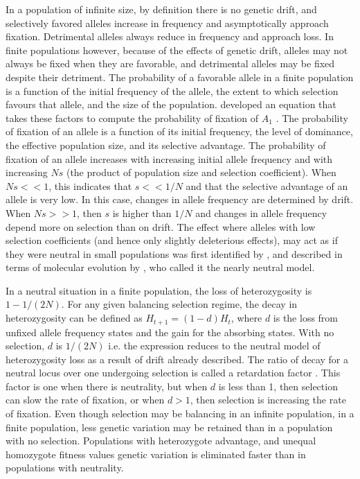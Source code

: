 In a population of infinite size, by definition there is no genetic drift, and selectively favored alleles increase in frequency and asymptotically approach fixation.
Detrimental alleles always reduce in frequency and approach loss.
In finite populations however, because of the effects of genetic drift, alleles may not always be fixed when they are favorable, and detrimental alleles may be fixed despite their detriment.
The probability of a favorable allele in a finite population is a function of the initial frequency of the allele, the extent to which selection favours that allele, and the size of the population.
\cite{Kimura1962} developed an equation that takes these factors to compute the probability of fixation of $A_1$ \parencite{kimura1971theoretical}.
The probability of fixation of an allele is a function of its initial frequency, the level of dominance, the effective population size, and its selective advantage.
The probability of fixation of an allele increases with increasing initial allele frequency and with increasing $Ns$ (the product of population size and selection coefficient).
When $Ns << 1$, this indicates that $s << 1/N$ and that the selective advantage of an allele is very low. In this case, changes in allele frequency are determined by drift.
When $Ns >> 1$, then $s$ is higher than $1/N$ and changes in allele frequency depend more on selection than on drift. 
The effect where alleles with low selection coefficients (and hence only slightly deleterious effects), may act as if they were neutral in small populations was first identified by \cite{Wright1931}, and described in terms of molecular evolution by \cite{Ohta1973}, who called it the nearly neutral model.

In a neutral situation in a finite population, the loss of heterozygosity is $1-1/(2N)$.
For any given balancing selection regime, the decay in heterozygosity can be defined as $H_{t+1} = (1-d)H_t$, where $d$ is the loss from unfixed allele frequency states and the gain for the absorbing states.
With no selection, $d$ is $1/(2N)$ i.e. the expression reduces to the neutral model of heterozygosity loss as a result of drift already described.
The ratio of decay for a neutral locus over one undergoing selection is called a retardation factor \parencite{Robertson1962}.
This factor is one when there is neutrality, but when $d$ is less than 1, then selection can slow the rate of fixation, or when $d > 1$, then selection is increasing the rate of fixation.
Even though selection may be balancing in an infinite population, in a finite population, less genetic variation may be retained than in a population with no selection.
Populations with heterozygote advantage, and unequal homozygote fitness values genetic variation is eliminated faster than in populations with neutrality.

